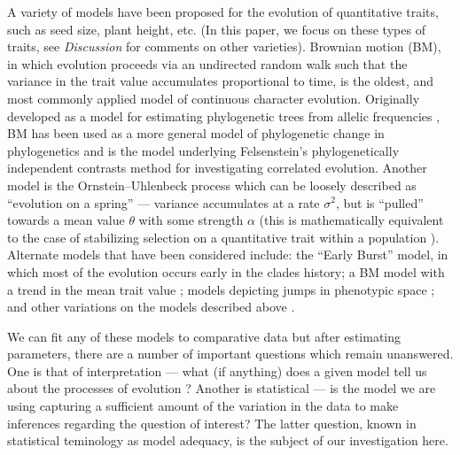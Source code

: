 \documentclass[12pt]{article}
\begin{document}
A variety of models have been proposed for the evolution of quantitative traits, such as seed size, plant height, etc. (In this paper, we focus on these types of traits, see \textit{Discussion} for comments on other varieties). Brownian motion (BM), in which evolution proceeds via an undirected random walk such that the variance in the trait value accumulates proportional to time, is the oldest, and most commonly applied model of continuous character evolution. Originally developed as a model for estimating phylogenetic trees from allelic frequencies \citep{EC1964}, BM has been used as a more general model of phylogenetic change in phylogenetics \citep{Felsenstein1973, Thompson1975, Felsenstein1988} and is the model underlying Felsenstein's phylogenetically independent contrasts method \citep[PICs;][]{Felsenstein1985} for investigating correlated evolution. Another model is the Ornstein--Uhlenbeck process \citep[OU;][]{Hansen1997} which can be loosely described as ``evolution on a spring'' --- variance accumulates at a rate $\sigma^2$, but is ``pulled'' towards a mean value $\theta$ with some strength $\alpha$ (this is mathematically equivalent to the case of stabilizing selection on a quantitative trait within a population \citep{Lande1976}). Alternate models that have been considered include: the ``Early Burst'' \citep[EB;][]{Blomberg2003, Harmon2010, SlaterPennell} model, in which most of the evolution occurs early in the clades history; a BM model with a trend in the mean trait value \citep{Hunt2006}; models depicting jumps in phenotypic space \citep{Landis2012, Eastmanlevy}; and other variations on the models described above \citep[e.g.][]{Pagel1997, Pagel1999, ButlerKing2004, Omeara2006, Eastman2011, Beaulieu2012, SlaterMEE}.

We can fit any of these models to comparative data but after estimating parameters, there are a number of important questions which remain unanswered. One is that of interpretation --- what (if anything) does a given model tell us about the processes of evolution \citep{HansenMartins1996, Hansen2012, PennellHarmon, PennellPE}? Another is statistical --- is the model we are using capturing a sufficient amount of the variation in the data to make inferences regarding the question of interest? The latter question, known in statistical teminology as model adequacy, is the subject of our investigation here.
\end{document}
